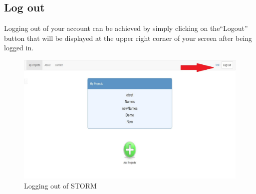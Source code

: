 \subsection{Log out}\par
Logging out of your account can be achieved by simply clicking on the``Logout'' button that will be displayed at the upper right corner of your screen after being logged in.
 \begin{figure}[H] 
	\centering
	\includegraphics[width=13cm]{./graphics/Logout.jpg}\par
	\caption{Logging out of STORM}
\end{figure}

